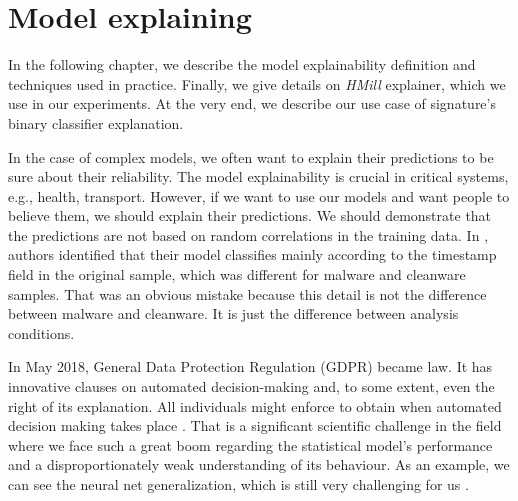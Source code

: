 \chapter{Model explaining} \label{chap:expth}
In the following chapter, we describe the model explainability definition and techniques used in practice. Finally, we give details on \emph{HMill} explainer, which we use in our experiments. At the very end, we describe our use case of signature's binary classifier explanation.

In the case of complex models, we often want to explain their predictions to be sure about their reliability. The model explainability is crucial in critical systems, e.g., health, transport. However, if we want to use our models and want people to believe them, we should explain their predictions. We should demonstrate that the predictions are not based on random correlations in the training data. In \cite{Pevny2020}, authors identified that their model classifies mainly according to the timestamp field in the original sample, which was different for malware and cleanware samples. That was an obvious mistake because this detail is not the difference between malware and cleanware. It is just the difference between analysis conditions.


In May 2018, General Data Protection Regulation (GDPR) became law. It has innovative clauses on automated decision-making and, to some extent, even the right of its explanation. All individuals might enforce to obtain  when automated decision making takes place \cite{Guidotti2018}. That is a significant scientific challenge in the field where we face such a great boom regarding the statistical model's performance and a disproportionately weak understanding of its behaviour. As an example, we can see the neural net generalization, which is still very challenging for us \cite{Zhang2016}.

